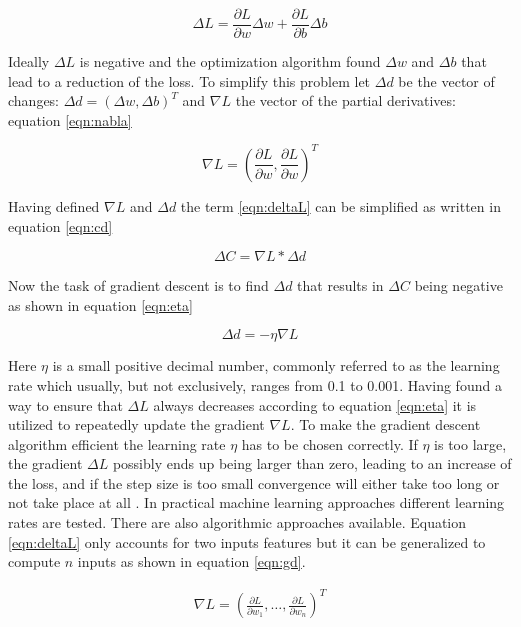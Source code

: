 \begin{equation}
 \Delta L = \frac{\partial L}{\partial w} \Delta w + \frac{\partial L}{\partial b} \Delta b
\label{eqn:deltaL} 
\end{equation}


Ideally $\Delta L$ is negative and the optimization algorithm found $\Delta w$ and $\Delta b$ that lead to a
reduction of the loss. To simplify this problem let $\Delta d$ be the vector of changes:
$\Delta d = (\Delta w , \Delta b)^T $ and $\nabla L$ the vector of the partial derivatives: equation
\ref{eqn:nabla}


\begin{equation}
 \nabla L = \left(\frac{\partial L}{\partial w}, \frac{\partial L}{\partial w}\right)^T
\label{eqn:nabla}
\end{equation}

Having defined $\nabla L$ and $\Delta d$ the term \ref{eqn:deltaL} can be simplified as written in equation \ref{eqn:cd}

\begin{equation}
\Delta C = \nabla L * \Delta d
 \label{eqn:cd}
\end{equation}


Now the task of gradient descent is to find $\Delta d$ that results in $\Delta C$ being negative
as shown in equation \ref{eqn:eta}

\begin{equation}
 \Delta d = -\eta \nabla L
 \label{eqn:eta}
\end{equation}


Here $\eta$ is a small positive decimal number, commonly referred to as the learning rate which usually, but
not exclusively, ranges from 0.1 to 0.001.  Having found a way to ensure that $\Delta L$ always decreases
according to equation \ref{eqn:eta} it is utilized to repeatedly update the gradient $\nabla L$. To make the
gradient descent algorithm efficient the learning rate $\eta$ has to be chosen correctly. If $\eta$ is too
large, the gradient $\Delta L$ possibly ends up being larger than zero, leading to an increase of the loss,
and if the step size is too small convergence will either take too long or not take place at all
\cite{bergstra2011algorithms}. In practical machine learning approaches different learning rates are
tested. There are also algorithmic approaches available. Equation \ref{eqn:deltaL} only accounts for two
inputs features but it can be generalized to compute $n$ inputs as shown in equation \ref{eqn:gd}.


\begin{eqnarray}
 \nabla L = \left(\frac{\partial L}{\partial w_1}, \ldots ,
 \frac{\partial L}{\partial w_n}\right)^T
 \label{eqn:gd}
\end{eqnarray}


